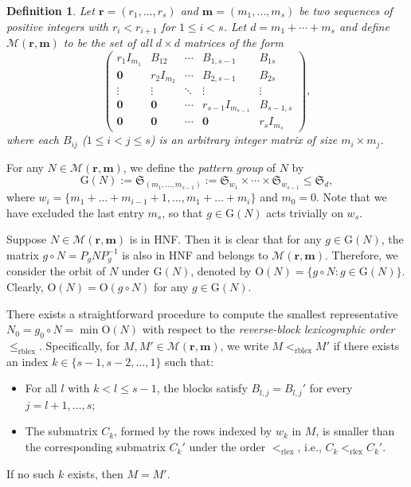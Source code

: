 \documentclass[reqno, 12pt]{article}
\theoremstyle{mydefinition}
\newtheorem{dfn}[thm]{Definition}
\theoremstyle{myremark}
\numberwithin{algorithm}{section}
\begin{document}
\begin{dfn}
Let $\mathbf{r} = (r_1, \dots, r_s)$ and $\mathbf{m} = (m_1, \dots, m_s)$ be two sequences of positive integers with $r_i < r_{i+1}$ for $1 \leq i < s$. Let $d = m_1 + \cdots + m_s$ and
define $\mathcal{M}(\mathbf{r}, \mathbf{m})$ to be the set of all $d \times d$ matrices of the form
\begin{equation}\label{form-PHA}
\begin{pmatrix}
    r_1 I_{m_1}    & B_{12} & \cdots & B_{1,s-1} & B_{1s} \\
    \mathbf{0} & r_2 I_{m_2} & \cdots & B_{2,s-1} & B_{2s} \\
    \vdots & \vdots & \ddots & \vdots & \vdots \\
    \mathbf{0} & \mathbf{0} & \cdots & r_{s-1} I_{m_{s-1}} & B_{s-1,s} \\
    \mathbf{0} &  \mathbf{0} &  \cdots &  \mathbf{0} & r_s I_{m_s}
\end{pmatrix},
\end{equation}
where each $B_{ij}$ ($1 \le i < j \le s$) is an arbitrary integer matrix of size $m_i \times m_j$.
\end{dfn}




For any $N \in \mathcal{M}(\mathbf{r}, \mathbf{m})$, we define the \emph{pattern group} of $N$ by
\[
\mathrm{G}(N) := \mathfrak{S}_{(m_1, \ldots, m_{s-1})} := \mathfrak{S}_{w_1} \times \cdots \times \mathfrak{S}_{w_{s-1}} \leq \mathfrak{S}_d,
\]
where $w_i = \{ m_1 + \dots + m_{i-1} + 1, \dots, m_1 + \dots + m_i \}$ and $m_0 = 0$.
Note that we have excluded the last entry $m_s$, so that $g \in \mathrm{G}(N)$ acts trivially on $w_s$.

Suppose $N \in \mathcal{M}(\mathbf{r}, \mathbf{m})$ is in HNF. Then it is clear that for any $g \in \mathrm{G}(N)$, the matrix $g \circ N = P_g N P_g^{-1}$ is also in HNF and belongs to $\mathcal{M}(\mathbf{r}, \mathbf{m})$.
Therefore, we consider the orbit of $N$ under $\mathrm{G}(N)$, denoted by $\mathrm{O}(N) = \{ g \circ N : g \in \mathrm{G}(N) \}$. Clearly, $\mathrm{O}(N) = \mathrm{O}(g \circ N)$ for any $g \in \mathrm{G}(N)$.


There exists a straightforward procedure to compute the smallest representative $N_0 = g_0 \circ N = \min \mathrm{O}(N)$ with respect to the \emph{reverse-block lexicographic order} $\leq_{\text{rblex}}$. Specifically, for $M, M' \in \mathcal{M}(\mathbf{r},\mathbf{m})$, we write $M <_{\text{rblex}} M'$ if there exists an index $k \in \{s-1,s-2,\dots,1\}$ such that:
\begin{itemize}
    \item[(i)] For all $l$ with $k < l \le s-1$, the blocks satisfy $B_{l,j} = B_{l,j}'$ for every $j = l+1, \dots, s$;
    \item[(ii)] The submatrix $C_k$, formed by the rows indexed by $w_k$ in $M$, is smaller than the corresponding submatrix $C_k'$ under the order $<_{\text{rlex}}$, i.e., $C_k <_{\text{rlex}} C_k'$.
\end{itemize}
If no such $k$ exists, then $M = M'$.
\end{document}

